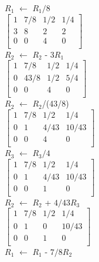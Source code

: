 \documentclass{article}
\begin{document}
$R_1$ $\leftarrow$ $R_1/8$ \\

$\begin{bmatrix}
    1 & 7/8 & 1/2 & 1/4\\
    3 & 8 & 2 & 2 \\
    0 & 0 & 4 & 0  \\
    \end{bmatrix}$ \\

$R_2$ $\leftarrow$ $R_2$ - $3R_1$\\

$\begin{bmatrix}
    1 & 7/8 & 1/2 & 1/4\\
    0 & 43/8 & 1/2 & 5/4 \\
    0 & 0 & 4 & 0  \\
    \end{bmatrix}$ \\
 
 $R_2$ $\leftarrow$ $R_2$/(43/8)\\
 
 $\begin{bmatrix}
    1 & 7/8 & 1/2 & 1/4\\
    0 & 1 & 4/43 & 10/43 \\
    0 & 0 & 4 & 0  \\
    \end{bmatrix}$ \\
    
 $R_3$ $\leftarrow$ $R_3/4$\\
 
  $\begin{bmatrix}
    1 & 7/8 & 1/2 & 1/4\\
    0 & 1 & 4/43 & 10/43 \\
    0 & 0 & 1 & 0  \\
    \end{bmatrix}$ \\
    
 $R_2$ $\leftarrow$ $R_2$ + $4/43R_3$\\
 
 $\begin{bmatrix}
    1 & 7/8 & 1/2 & 1/4\\
    0 & 1 & 0 & 10/43 \\
    0 & 0 & 1 & 0  \\
    \end{bmatrix}$ \\
    
 $R_1$ $\leftarrow$ $R_1$ - $7/8R_2$\\
 
\end{document}
